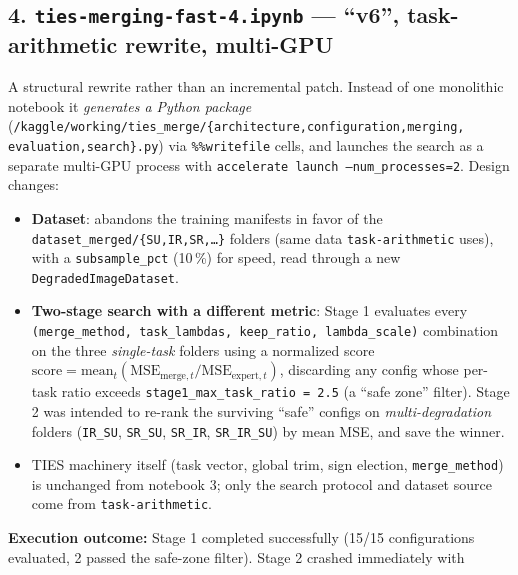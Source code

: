 \documentclass[11pt]{article}
\begin{document}
\subsection*{4. \texttt{ties-merging-fast-4.ipynb} --- ``v6'', task-arithmetic rewrite, multi-GPU}
A structural rewrite rather than an incremental patch. Instead of one
monolithic notebook it \emph{generates a Python package}
(\texttt{/kaggle/working/ties\_merge/\{architecture,configuration,merging,\allowbreak
evaluation,search\}.py}) via \texttt{\%\%writefile} cells, and launches the
search as a separate multi-GPU process with
\texttt{accelerate launch --num\_processes=2}. Design changes:
\begin{itemize}[nosep]
  \item \textbf{Dataset}: abandons the training manifests in favor of the
  \texttt{dataset\_merged/\{SU,IR,SR,\dots\}} folders (same data
  \texttt{task-arithmetic} uses), with a \texttt{subsample\_pct} (10\,\%) for
  speed, read through a new \texttt{DegradedImageDataset}.
  \item \textbf{Two-stage search with a different metric}: Stage 1 evaluates
  every \texttt{(merge\_method, task\_lambdas, keep\_ratio, lambda\_scale)}
  combination on the three \emph{single-task} folders using a
  normalized score $\text{score}=\text{mean}_t(\text{MSE}_{\text{merge}, t} /
  \text{MSE}_{\text{expert}, t})$, discarding any config whose per-task ratio
  exceeds \texttt{stage1\_max\_task\_ratio = 2.5} (a ``safe zone'' filter).
  Stage 2 was intended to re-rank the surviving ``safe'' configs on
  \emph{multi-degradation} folders (\texttt{IR\_SU}, \texttt{SR\_SU},
  \texttt{SR\_IR}, \texttt{SR\_IR\_SU}) by mean MSE, and save the winner.
  \item TIES machinery itself (task vector, global trim, sign election,
  \texttt{merge\_method}) is unchanged from notebook 3; only the search
  protocol and dataset source come from \texttt{task-arithmetic}.
\end{itemize}
\textbf{Execution outcome:} Stage 1 completed successfully (15/15
configurations evaluated, 2 passed the safe-zone filter). Stage 2 crashed
immediately with
\end{document}
